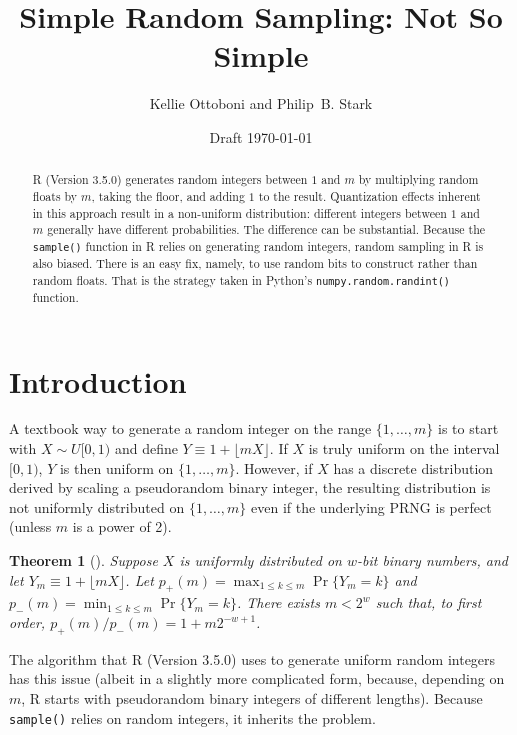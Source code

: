 \documentclass[12pt]{article}
\title{Simple Random Sampling: Not So Simple}
\author{Kellie Ottoboni and Philip~B. Stark}
\date{Draft \today}
\newtheorem{theorem}{Theorem}[section]
\begin{document}
\maketitle


\begin{abstract}
R (Version 3.5.0) generates random integers between $1$ and $m$
by multiplying random floats by $m$, taking the floor, and adding $1$ to the result.
Quantization effects inherent in this approach result in a non-uniform distribution: 
different integers between $1$ and $m$ generally have different probabilities.
The difference can be substantial.
Because the \texttt{sample()} function in R relies on generating random integers,
random sampling in R is also biased.
There is an easy fix, namely, to use random bits to construct rather than random floats.
That is the strategy taken in Python's \texttt{numpy.random.randint()} function.
\end{abstract}



\section{Introduction}
A textbook way to generate a random integer on the range $\{1, \dots, m\}$ is to start with $X \sim U[0,1)$ and define $Y \equiv 1 + \lfloor mX \rfloor$. 
If $X$ is truly uniform on the interval $[0,1)$, $Y$ is then uniform on $\{1, \dots, m\}$.
However, if $X$ has a discrete distribution derived by scaling a pseudorandom binary integer, 
the resulting distribution is not uniformly distributed on 
$\{1, \ldots, m \}$ even if the underlying PRNG is perfect (unless $m$ is a power of 2).

\begin{theorem}[\citet{knuth_art_1997}] %
Suppose $X$ is uniformly distributed on $w$-bit binary numbers, and
let $Y_m \equiv 1 + \lfloor mX \rfloor$.
Let $p_+(m) = \max_{1 \le k \le m} \Pr\{Y_m = k\}$ and $p_-(m) = \min_{1 \le k \le m} \Pr\{Y_m = k\}$.
There exists $m < 2^w$ such that, to first order, 
$p_+(m)/p_-(m) = 1 + m2^{-w+1}$.
\end{theorem}

The algorithm that R (Version 3.5.0) \citep{R_2018} uses to generate uniform random integers
has this issue (albeit in a slightly more complicated form, because, depending on $m$,
R starts with pseudorandom binary integers of different lengths). 
Because \texttt{sample()} relies on random integers, it inherits the problem.
\end{document}

